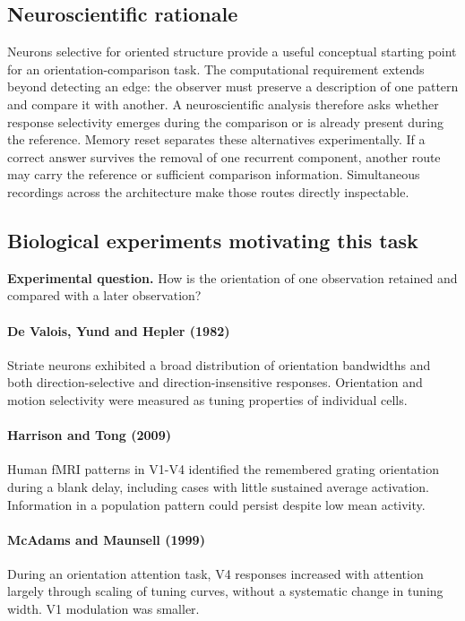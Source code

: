 \documentclass[11pt]{article}
\begin{document}
\subsection{Neuroscientific rationale}
Neurons selective for oriented structure provide a useful conceptual starting point for an orientation-comparison task. The computational requirement extends beyond detecting an edge: the observer must preserve a description of one pattern and compare it with another. A neuroscientific analysis therefore asks whether response selectivity emerges during the comparison or is already present during the reference. Memory reset separates these alternatives experimentally. If a correct answer survives the removal of one recurrent component, another route may carry the reference or sufficient comparison information. Simultaneous recordings across the architecture make those routes directly inspectable.

\subsection{Biological experiments motivating this task}
\textbf{Experimental question.} How is the orientation of one observation retained and compared with a later observation?

\paragraph{De Valois, Yund and Hepler (1982)} Striate neurons exhibited a broad distribution of orientation bandwidths and both direction-selective and direction-insensitive responses. Orientation and motion selectivity were measured as tuning properties of individual cells. \cite{bio_devalois_o}

\paragraph{Harrison and Tong (2009)} Human fMRI patterns in V1-V4 identified the remembered grating orientation during a blank delay, including cases with little sustained average activation. Information in a population pattern could persist despite low mean activity. \cite{bio_harrison}

\paragraph{McAdams and Maunsell (1999)} During an orientation attention task, V4 responses increased with attention largely through scaling of tuning curves, without a systematic change in tuning width. V1 modulation was smaller. \cite{bio_mcadams}
\end{document}
